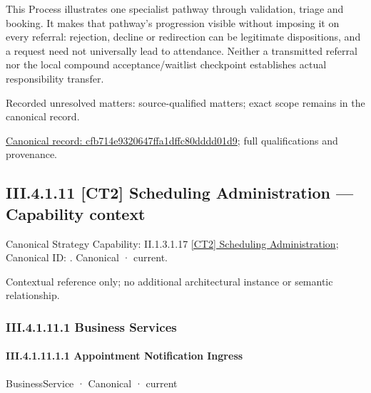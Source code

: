 This Process illustrates one specialist pathway through validation, triage and booking. It makes that pathway's progression visible without imposing it on every referral: rejection, decline or redirection can be legitimate dispositions, and a request need not universally lead to attendance. Neither a transmitted referral nor the local compound acceptance/waitlist checkpoint establishes actual responsibility transfer.


{\small Recorded unresolved matters: source-qualified matters; exact scope remains in the canonical record.}\par
{\footnotesize \href{../../../../continuum/business/business-process/cfb714e9320647ffa1dffc80dddd01d9.md}{Canonical record: cfb714e9320647ffa1dffc80dddd01d9}; full qualifications and provenance.}\par
\subsection*{III.4.1.11 [CT2] Scheduling Administration — Capability context}
\label{navigation:III.4.1.11}

{\small Canonical Strategy Capability: II.1.3.1.17 \hyperref[element:35fb3744c900470f9895056246a13fb1]{[CT2] Scheduling Administration}; Canonical ID: \texttt{}. Canonical · current.}\par
Contextual reference only; no additional architectural instance or semantic relationship.\par
\subsubsection*{III.4.1.11.1 Business Services}
\label{navigation:III.4.1.11.1}

\paragraph*{III.4.1.11.1.1 Appointment Notification Ingress}
\label{navigation:III.4.1.11.1.1}

\label{element:67045c71e2194f6ba19002edcea94ee0}
{\small BusinessService · Canonical · current}\par

